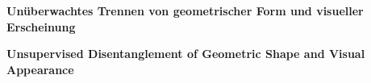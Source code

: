 \thispagestyle{empty}
\begin{center}
  \begin{minipage}[c][0.48\textheight][b]{0.9\textwidth}
    \small
    \textbf{
     Unüberwachtes Trennen von geometrischer Form und visueller Erscheinung
    }\par
    \vspace{\baselineskip}
    
  \end{minipage}\par
  \vfill
  \begin{minipage}[c][0.48\textheight][b]{0.9\textwidth}
    \small
    \textbf{
     Unsupervised Disentanglement of Geometric Shape and Visual Appearance
    }\par
    \vspace{\baselineskip}
    
  \end{minipage}
\end{center}

